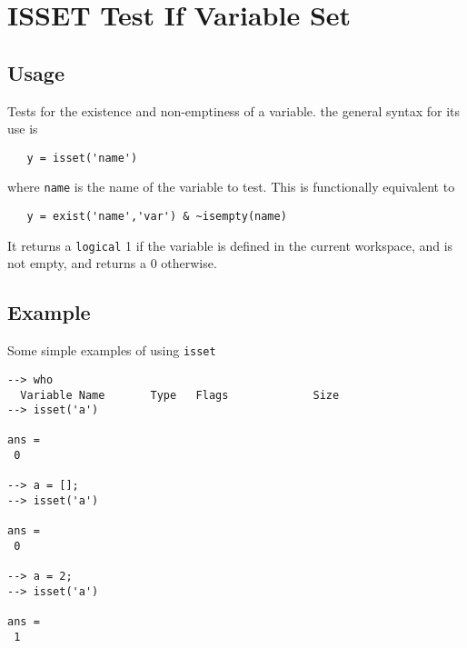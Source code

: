\section{ISSET Test If Variable Set}

\subsection{Usage}

Tests for the existence and non-emptiness of a variable.
the general syntax for its use is
\begin{verbatim}
   y = isset('name')
\end{verbatim}
where \verb|name| is the name of the variable to test.  This
is functionally equivalent to 
\begin{verbatim}
   y = exist('name','var') & ~isempty(name)
\end{verbatim}
It returns a \verb|logical| 1 if the variable is defined 
in the current workspace, and is not empty, and returns
a 0 otherwise.
\subsection{Example}

Some simple examples of using \verb|isset|
\begin{verbatim}
--> who
  Variable Name       Type   Flags             Size
--> isset('a')

ans = 
 0 

--> a = [];
--> isset('a')

ans = 
 0 

--> a = 2;
--> isset('a')

ans = 
 1 
\end{verbatim}
